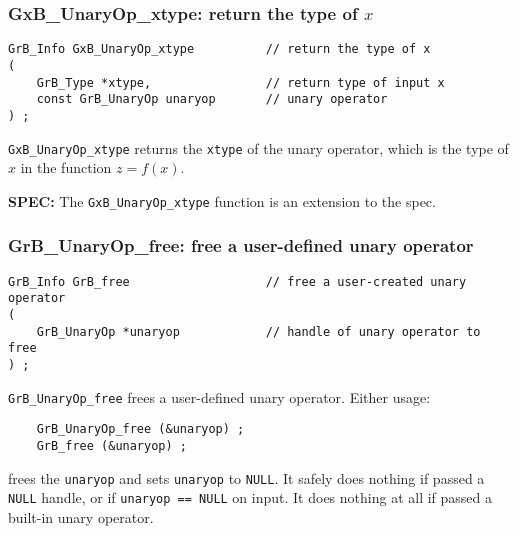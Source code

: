 \documentclass[12pt]{article}
\begin{document}
\subsubsection{{\sf GxB\_UnaryOp\_xtype:} return the type of $x$} 
\label{unaryop_xtype}

\begin{mdframed}[userdefinedwidth=6in]
{\footnotesize
\begin{verbatim}
GrB_Info GxB_UnaryOp_xtype          // return the type of x
(
    GrB_Type *xtype,                // return type of input x
    const GrB_UnaryOp unaryop       // unary operator
) ;
\end{verbatim}
}\end{mdframed}

\verb'GxB_UnaryOp_xtype' returns the \verb'xtype' of the unary operator, which
is the type of $x$ in the function $z=f(x)$.

\begin{spec}
{\bf SPEC:} The \verb'GxB_UnaryOp_xtype' function is an extension to the spec.
\end{spec}

\subsubsection{{\sf GrB\_UnaryOp\_free:} free a user-defined unary operator}
\label{unaryop_free}

\begin{mdframed}[userdefinedwidth=6in]
{\footnotesize
\begin{verbatim}
GrB_Info GrB_free                   // free a user-created unary operator
(
    GrB_UnaryOp *unaryop            // handle of unary operator to free
) ;
\end{verbatim}
}\end{mdframed}

\verb'GrB_UnaryOp_free' frees a user-defined unary operator.
Either usage:

    {\small
    \begin{verbatim}
    GrB_UnaryOp_free (&unaryop) ;
    GrB_free (&unaryop) ; \end{verbatim}}

\noindent
frees the \verb'unaryop' and sets \verb'unaryop' to \verb'NULL'. 
It safely does nothing if passed a \verb'NULL'
handle, or if \verb'unaryop == NULL' on input.
It does nothing at all if passed a built-in unary operator.
\end{document}
